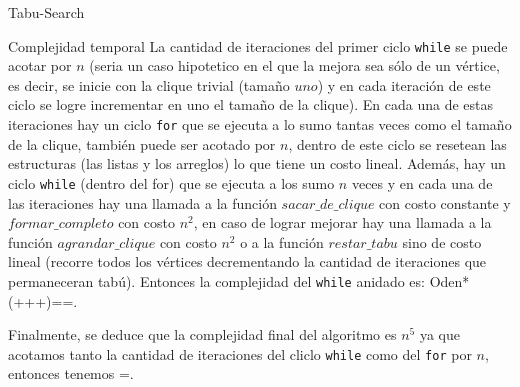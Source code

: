 \begin{section}{Tabu-Search}
\begin{subsection}{Complejidad temporal}
			 La cantidad de iteraciones del primer ciclo \texttt{while} se puede acotar por $n$ (seria un caso hipotetico en el que la mejora sea sólo de un vértice, es decir, se inicie con la clique trivial (tamaño $uno$) y en cada iteración de este ciclo se logre incrementar en uno el tamaño de la clique). En cada una de estas iteraciones hay un ciclo \texttt{for} que se ejecuta a lo sumo tantas veces como el tamaño de la clique, también puede ser acotado por $n$, dentro de este ciclo se resetean las estructuras (las listas y los arreglos) lo que tiene un costo lineal. Además, hay un ciclo \texttt{while} (dentro del for) que se ejecuta a los sumo $n$ veces y en cada una de las iteraciones hay una llamada a la función $sacar\_de\_clique$ con costo constante y $formar\_completo$ con costo $n^2$, en caso de lograr mejorar hay una llamada a la función $agrandar\_clique$ con costo $n^2$ o a la función $restar\_tabu$ sino de costo lineal (recorre todos los vértices decrementando la cantidad de iteraciones que permaneceran tabú). Entonces la complejidad del \texttt{while} anidado es:  Ode{n*(+++)}==.

			 Finalmente, se deduce que la complejidad final del algoritmo es $n^5$ ya que acotamos tanto la cantidad de iteraciones del cliclo \texttt{while} como del \texttt{for} por $n$, entonces tenemos =.
	\end{subsection}

\end{section}

